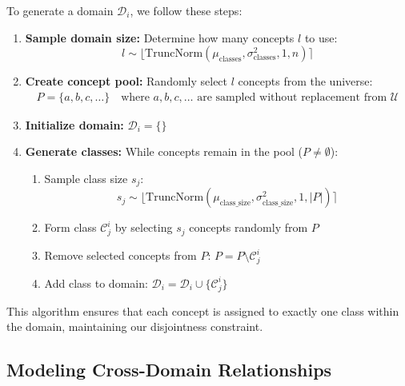 To generate a domain $\mathcal{D}_i$, we follow these steps:

\begin{enumerate}
    \item \textbf{Sample domain size:} Determine how many concepts $l$ to use:
          \begin{equation*}
              l \sim \lfloor\text{TruncNorm}(\mu_{\text{classes}}, \sigma^2_{\text{classes}}, 1, n)\rceil
          \end{equation*}

    \item \textbf{Create concept pool:} Randomly select $l$ concepts from the universe:
          \begin{align*}
              P = \{a, b, c, \ldots\} \quad \text{where } a, b, c, \ldots \text{ are sampled without replacement from } \mathcal{U}
          \end{align*}

    \item \textbf{Initialize domain:} $\mathcal{D}_i = \{\}$

    \item \textbf{Generate classes:} While concepts remain in the pool ($P \neq \emptyset$):
          \begin{enumerate}
              \item Sample class size $s_j$:
                    \begin{equation*}
                        s_j \sim \lfloor\text{TruncNorm}(\mu_{\text{class\_size}}, \sigma^2_{\text{class\_size}}, 1, |P|)\rceil
                    \end{equation*}

              \item Form class $\mathcal{C}_j^i$ by selecting $s_j$ concepts randomly from $P$

              \item Remove selected concepts from $P$: $P = P \setminus \mathcal{C}_j^i$

              \item Add class to domain: $\mathcal{D}_i = \mathcal{D}_i \cup \{\mathcal{C}_j^i\}$
          \end{enumerate}
\end{enumerate}

This algorithm ensures that each concept is assigned to exactly one class within the domain, maintaining our disjointness constraint.

\subsection{Modeling Cross-Domain Relationships}

